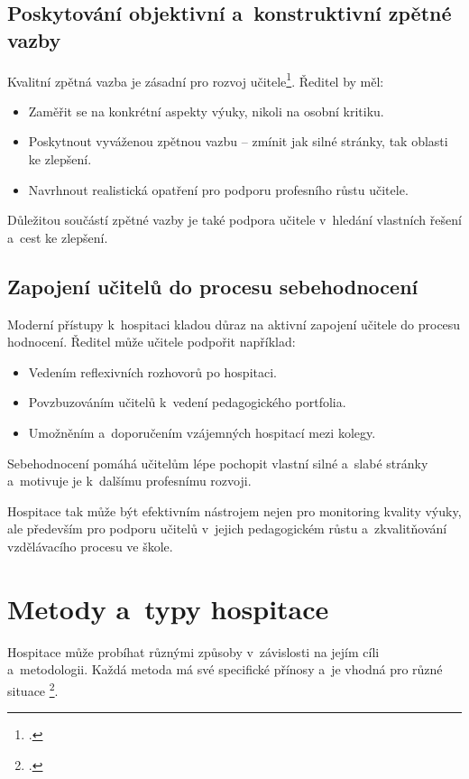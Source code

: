 \subsection{Poskytování objektivní a~konstruktivní zpětné vazby}
Kvalitní zpětná vazba je zásadní pro rozvoj učitele\footcite[16]{hospitace-funkce}. Ředitel by měl:

\begin{itemize}
    \item Zaměřit se na konkrétní aspekty výuky, nikoli na osobní kritiku.
    \item Poskytnout vyváženou zpětnou vazbu – zmínit jak silné stránky, tak oblasti ke zlepšení.
    \item Navrhnout realistická opatření pro podporu profesního růstu učitele.
\end{itemize}

Důležitou součástí zpětné vazby je také podpora učitele v~hledání vlastních řešení a~cest ke zlepšení.

\subsection{Zapojení učitelů do procesu sebehodnocení}
Moderní přístupy k~hospitaci kladou důraz na aktivní zapojení učitele do procesu hodnocení. Ředitel může učitele podpořit například:

\begin{itemize}
    \item Vedením reflexivních rozhovorů po hospitaci.
    \item Povzbuzováním učitelů k~vedení pedagogického portfolia.
    \item Umožněním a~doporučením vzájemných hospitací mezi kolegy.
\end{itemize}

Sebehodnocení pomáhá učitelům lépe pochopit vlastní silné a~slabé stránky a~motivuje je k~dalšímu profesnímu rozvoji.

Hospitace tak může být efektivním nástrojem nejen pro monitoring kvality výuky, ale především pro podporu učitelů v~jejich pedagogickém růstu a~zkvalitňování vzdělávacího procesu ve škole.



\section{Metody a~typy hospitace}

Hospitace může probíhat různými způsoby v~závislosti na jejím cíli a~metodologii. Každá metoda má své specifické přínosy a~je vhodná pro různé situace \footcite[122]{ped-proces-rizeni}.

